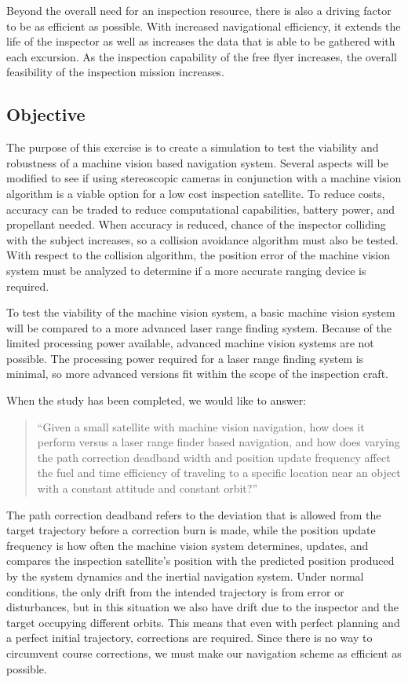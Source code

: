 \documentclass[journal, 10pt]{IEEEtran}
\begin{document}
Beyond the overall need for an inspection resource, there is also a driving factor to be as efficient as possible.  With increased navigational efficiency, it extends the life of the inspector as well as increases the data that is able to be gathered with each excursion.  As the inspection capability of the free flyer increases, the overall feasibility of the inspection mission increases.


\subsection{Objective}
The purpose of this exercise is to create a simulation to test the viability and robustness of a machine vision based navigation system.  Several aspects will be modified to see if using stereoscopic cameras in conjunction with a machine vision algorithm is a viable option for a low cost inspection satellite.  To reduce costs, accuracy can be traded to reduce computational capabilities, battery power, and propellant needed.  When accuracy is reduced, chance of the inspector colliding with the subject increases, so a collision avoidance algorithm must also be tested.  With respect to the collision algorithm, the position error of the machine vision system must be analyzed to determine if a more accurate ranging device is required.

To test the viability of the machine vision system, a basic machine vision system will be compared to a more advanced laser range finding system.  Because of the limited processing power available, advanced machine vision systems are not possible.  The processing power required for a laser range finding system is minimal, so more advanced versions fit within the scope of the inspection craft.

When the study has been completed, we would like to answer:

\begin{quote}
``Given a small satellite with machine vision navigation, how does it perform versus a laser range finder based navigation, and how does varying the path correction deadband width and position update frequency affect the fuel and time efficiency of traveling to a specific location near an object with a constant attitude and constant orbit?''
\end{quote}

The path correction deadband refers to the deviation that is allowed from the target trajectory before a correction burn is made, while the position update frequency is how often the machine vision system determines, updates, and compares the inspection satellite's position with the predicted position produced by the system dynamics and the inertial navigation system.  Under normal conditions, the only drift from the intended trajectory is from error or disturbances, but in this situation we also have drift due to the inspector and the target occupying different orbits.  This means that even with perfect planning and a perfect initial trajectory, corrections are required.  Since there is no way to circumvent course corrections, we must make our navigation scheme as efficient as possible.
\end{document}
